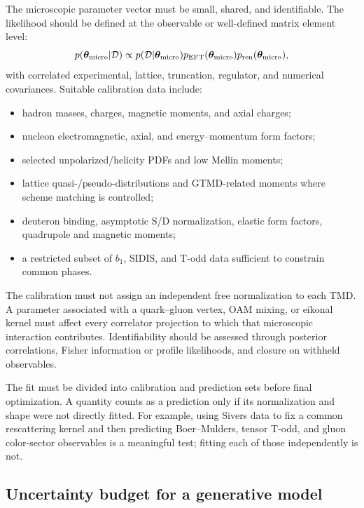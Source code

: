 \documentclass[11pt]{article}
\begin{document}
The microscopic parameter vector must be small, shared, and identifiable.
The likelihood should be defined at the observable or well-defined matrix
element level:
\begin{equation}
p(\bm\theta_{\rm micro}|\mathcal D)
\propto
p(\mathcal D|\bm\theta_{\rm micro})
p_{\rm EFT}(\bm\theta_{\rm micro})
p_{\rm ren}(\bm\theta_{\rm micro}),
\label{eq:micro-posterior}
\end{equation}
with correlated experimental, lattice, truncation, regulator, and numerical
covariances.  Suitable calibration data include:
\begin{itemize}
  \item hadron masses, charges, magnetic moments, and axial charges;
  \item nucleon electromagnetic, axial, and energy--momentum form factors;
  \item selected unpolarized/helicity PDFs and low Mellin moments;
  \item lattice quasi-/pseudo-distributions and GTMD-related moments where
  scheme matching is controlled;
  \item deuteron binding, asymptotic S/D normalization, elastic form factors,
  quadrupole and magnetic moments;
  \item a restricted subset of \(b_1\), SIDIS, and T-odd data sufficient to
  constrain common phases.
\end{itemize}

The calibration must not assign an independent free normalization to each
TMD.  A parameter associated with a quark--gluon vertex, OAM mixing, or
eikonal kernel must affect every correlator projection to which that
microscopic interaction contributes.  Identifiability should be assessed
through posterior correlations, Fisher information or profile likelihoods,
and closure on withheld observables.

The fit must be divided into calibration and prediction sets before final
optimization.  A quantity counts as a prediction only if its normalization
and shape were not directly fitted.  For example, using Sivers data to fix a
common rescattering kernel and then predicting Boer--Mulders, tensor T-odd,
and gluon color-sector observables is a meaningful test; fitting each of
those independently is not.

\subsection{Uncertainty budget for a generative model}
\end{document}
